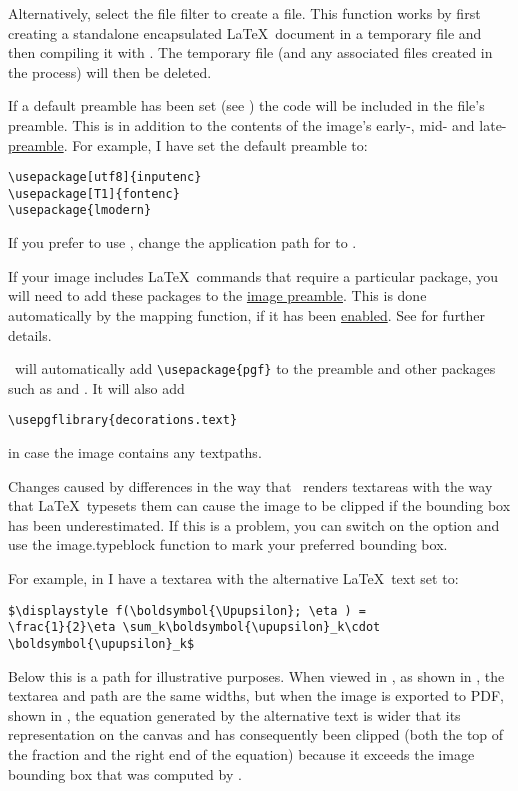 Alternatively, select the  file filter to create
a  file.  This function works by first creating a
standalone encapsulated \LaTeX\ document in a temporary file and
then compiling it with . The temporary file (and any
associated files created in the process) will then be deleted.

If a default preamble has been set (see
) the code will be included in the
 file's preamble.  This is in
addition to the contents of the image's early-, mid- and
late-\hyperref[sec:preamble]{preamble}. For example, I have set the
default preamble to:
\begin{verbatim}
\usepackage[utf8]{inputenc}
\usepackage[T1]{fontenc}
\usepackage{lmodern}
\end{verbatim}
If you prefer to use , change the application path for
 to .

If your image includes \LaTeX\ commands that require a particular
package, you will need to add these packages to the
\hyperref[sec:preamble]{image preamble}. This is done automatically
by the mapping function, if it has been
\hyperref[mi:texmappings]{enabled}.  See
 for further details.

\FlowframTk\ will automatically add
\verb|\usepackage{pgf}| to the preamble and other packages such as
 and . It will also add
\begin{verbatim}
\usepgflibrary{decorations.text}
\end{verbatim}
in case the image contains any \glspl{textpath}.

\begin{warning}
Changes caused by differences in the way that \FlowframTk\ renders
\glspl{textarea} with the way that \LaTeX\ typesets them
can cause the image to be clipped if the bounding box
has been underestimated. If this is a problem, you can switch on
the 
option and use the \gls{image.typeblock} function to mark your
preferred bounding box.
\end{warning}

For example, in  I have a \gls{textarea} with the
alternative \LaTeX\ text set to:
\begin{verbatim}
$\displaystyle f(\boldsymbol{\Upupsilon}; \eta ) = 
\frac{1}{2}\eta \sum_k\boldsymbol{\upupsilon}_k\cdot 
\boldsymbol{\upupsilon}_k$
\end{verbatim}
Below this is a \gls{path} for illustrative purposes. When viewed in
\FlowframTk, as shown in , the
\gls*{textarea} and \gls*{path} are the same widths, but when the
image is exported to PDF, shown in , the
equation generated by the alternative text is wider that its
representation on the \gls{canvas} and has consequently been clipped
(both the top of the fraction and the right end of the equation)
because it exceeds the image bounding box that was computed by
\FlowframTk.


